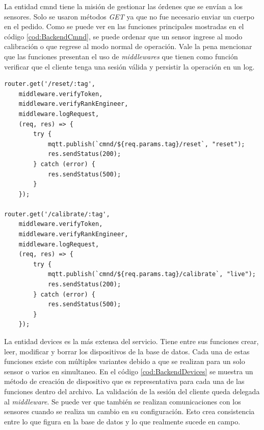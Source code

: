 La entidad cmnd tiene la misión de gestionar las órdenes que se envían a los sensores.
Solo se usaron métodos \emph{GET} ya que no fue necesario enviar un cuerpo en el pedido.
Como se puede ver en las funciones principales mostradas en el código \ref{cod:BackendCmnd}, se puede ordenar que un sensor ingrese al modo calibración o que regrese al modo normal de operación.
Vale la pena mencionar que las funciones presentan el uso de \emph{middlewares} que tienen como función verificar que el cliente tenga una sesión válida y persistir la operación en un log.

\begin{lstlisting}[label=cod:BackendCmnd,caption=Funciones principales de la entidad cmnd]
router.get('/reset/:tag',
    middleware.verifyToken,
    middleware.verifyRankEngineer,
    middleware.logRequest,
    (req, res) => {
        try {
            mqtt.publish(`cmnd/${req.params.tag}/reset`, "reset");
            res.sendStatus(200);
        } catch (error) {
            res.sendStatus(500);
        }
    });

router.get('/calibrate/:tag',
    middleware.verifyToken,
    middleware.verifyRankEngineer,
    middleware.logRequest,
    (req, res) => {
        try {
            mqtt.publish(`cmnd/${req.params.tag}/calibrate`, "live");
            res.sendStatus(200);
        } catch (error) {
            res.sendStatus(500);
        }
    });
\end{lstlisting}

La entidad devices es la más extensa del servicio.
Tiene entre sus funciones crear, leer, modificar y borrar los dispositivos de la base de datos.
Cada una de estas funciones existe con múltiples variantes debido a que se realizan para un solo sensor o varios en simultaneo.
En el código \ref{cod:BackendDevices} se muestra un método de creación de dispositivo que es representativa para cada una de las funciones dentro del archivo.
La validación de la sesión del cliente queda delegada al \emph{middleware}.
Se puede ver que también se realizan comunicaciones con los sensores cuando se realiza un cambio en su configuración.
Esto crea consistencia entre lo que figura en la base de datos y lo que realmente sucede en campo.

\newpage


